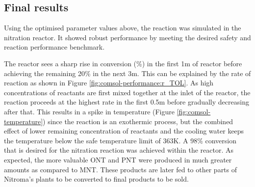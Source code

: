 \subsection{Final results}
Using the optimised parameter values above, the reaction was simulated in the nitration reactor. It showed robust performance by meeting the desired safety and reaction performance benchmark.

The reactor sees a sharp rise in conversion (\%) in the first 1m of reactor before achieving the remaining 20\% in the next \approx 3m. This can be explained by the rate of reaction as shown in Figure \ref{fig:comsol-performance:r_TOL}. As high concentrations of reactants are first mixed together at the inlet of the reactor, the reaction proceeds at the highest rate in the first 0.5m before gradually decreasing after that. This results in a spike in temperature (Figure \ref{fig:comsol-temperature}) since the reaction is an exothermic process, but the combined effect of lower remaining concentration of reactants and the cooling water keeps the temperature below the safe temperature limit of 363K. A 98\% conversion that is desired for the nitration reaction was achieved within the reactor. As expected, the more valuable ONT and PNT were produced in much greater amounts as compared to MNT. These products are later fed to other parts of Nitroma's plants to be converted to final products to be sold.

